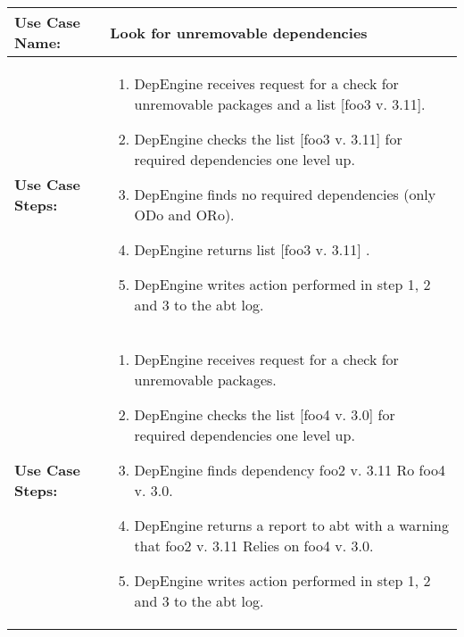 
\begin{tabularx}{\linewidth}{|l|X|}
\hline
\textbf{Use Case Name:} & \textbf{Look for unremovable dependencies} \\
\hline
\textbf{Use Case Steps:} & 
\begin{minipage}{\linewidth} 
 \vspace{0.05em}
  \begin{enumerate}
   \item DepEngine receives request for a check for unremovable packages and a list [foo3 v. 3.11].
   \item DepEngine checks the list [foo3 v. 3.11]  for required dependencies one level up.
   \item DepEngine finds no required dependencies (only ODo and ORo).
   \item DepEngine returns list [foo3 v. 3.11] .
   \item DepEngine writes action performed in step 1, 2 and 3 to the abt log.
  \end{enumerate}
 \vspace{0.05em}
\end{minipage}
\\
\hline 
\textbf{Use Case Steps:} & 
\begin{minipage}{\linewidth} 
 \vspace{0.05em}
  \begin{enumerate}
   \item DepEngine receives request for a check for unremovable packages.
   \item DepEngine checks the list [foo4 v. 3.0]  for required dependencies one level up.   
   \item DepEngine finds dependency foo2 v. 3.11 Ro foo4 v. 3.0.
   \item DepEngine returns a report to abt with a warning that foo2 v. 3.11 Relies on foo4 v. 3.0.
   \item DepEngine writes action performed in step 1, 2 and 3 to the abt log.
  \end{enumerate}
 \vspace{0.05em}
\end{minipage}
\\
\hline
\end{tabularx}


